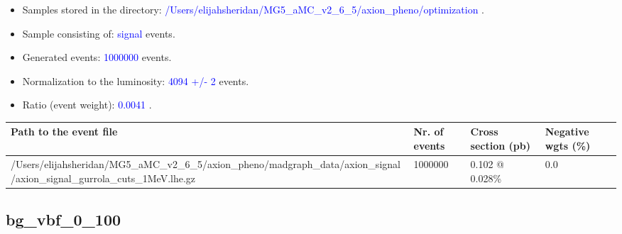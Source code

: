 \documentclass[a4paper, 10pt]{article}
\begin{document}
\begin{itemize}
  \item Samples stored in the directory: \textcolor{blue}{/\-Users/\-elijahsheridan/\-MG5\_aMC\_v2\_6\_5/\-axion\_pheno/\-optimization} .
   \item Sample consisting of: \textcolor{blue}{signal}  events.
   \item Generated events: \textcolor{blue}{1000000 }  events.
   \item Normalization to the luminosity: \textcolor{blue}{4094}\textcolor{blue}{ +/\-- }\textcolor{blue}{2 }  events.
   \item Ratio (event weight): \textcolor{blue}{0.0041 } .  
 
\end{itemize}
\begin{table}[H]
  \begin{center}
    \begin{tabular}{|m{55.0mm}|m{25.0mm}|m{30.0mm}|m{30.0mm}|}
      \hline
      {\cellcolor{yellow}         Path to the event file}& {\cellcolor{yellow}         Nr. of events}& {\cellcolor{yellow}         Cross section (pb)}& {\cellcolor{yellow}         Negative wgts (\%)}\\
      \hline
      {\cellcolor{white}          /\-Users/\-elijahsheridan/\-MG5\_aMC\_v2\_6\_5/\-axion\_pheno/\-madgraph\_data/\-axion\_signal/\-axion\_signal\_gurrola\_cuts\_1MeV.lhe.gz}& {\cellcolor{white}          1000000}& {\cellcolor{white}          0.102 @ 0.028\%}& {\cellcolor{white}          0.0}\\
\hline
    \end{tabular}
  \end{center}
\end{table}

\subsection{ bg\_vbf\_0\_100}
\end{document}
